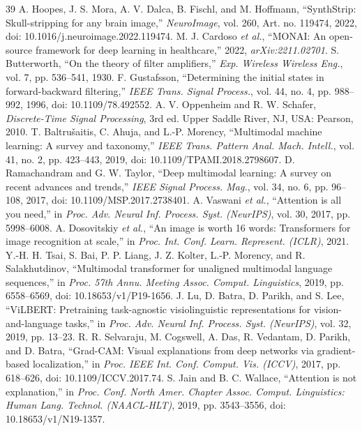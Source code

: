 \begin{thebibliography}{39}
A. Hoopes, J. S. Mora, A. V. Dalca, B. Fischl, and M. Hoffmann, ``SynthStrip: Skull-stripping for any brain image,'' \emph{NeuroImage}, vol. 260, Art. no. 119474, 2022, doi: 10.1016/j.neuroimage.2022.119474.
M. J. Cardoso \emph{et al.}, ``MONAI: An open-source framework for deep learning in healthcare,'' 2022, \emph{arXiv:2211.02701}.
S. Butterworth, ``On the theory of filter amplifiers,'' \emph{Exp. Wireless Wireless Eng.}, vol. 7, pp. 536--541, 1930.
F. Gustafsson, ``Determining the initial states in forward-backward filtering,'' \emph{IEEE Trans. Signal Process.}, vol. 44, no. 4, pp. 988--992, 1996, doi: 10.1109/78.492552.
A. V. Oppenheim and R. W. Schafer, \emph{Discrete-Time Signal Processing}, 3rd ed. Upper Saddle River, NJ, USA: Pearson, 2010.
T. Baltru\v{s}aitis, C. Ahuja, and L.-P. Morency, ``Multimodal machine learning: A survey and taxonomy,'' \emph{IEEE Trans. Pattern Anal. Mach. Intell.}, vol. 41, no. 2, pp. 423--443, 2019, doi: 10.1109/TPAMI.2018.2798607.
D. Ramachandram and G. W. Taylor, ``Deep multimodal learning: A survey on recent advances and trends,'' \emph{IEEE Signal Process. Mag.}, vol. 34, no. 6, pp. 96--108, 2017, doi: 10.1109/MSP.2017.2738401.
A. Vaswani \emph{et al.}, ``Attention is all you need,'' in \emph{Proc. Adv. Neural Inf. Process. Syst. (NeurIPS)}, vol. 30, 2017, pp. 5998--6008.
A. Dosovitskiy \emph{et al.}, ``An image is worth 16 words: Transformers for image recognition at scale,'' in \emph{Proc. Int. Conf. Learn. Represent. (ICLR)}, 2021.
Y.-H. H. Tsai, S. Bai, P. P. Liang, J. Z. Kolter, L.-P. Morency, and R. Salakhutdinov, ``Multimodal transformer for unaligned multimodal language sequences,'' in \emph{Proc. 57th Annu. Meeting Assoc. Comput. Linguistics}, 2019, pp. 6558--6569, doi: 10.18653/v1/P19-1656.
J. Lu, D. Batra, D. Parikh, and S. Lee, ``ViLBERT: Pretraining task-agnostic visiolinguistic representations for vision-and-language tasks,'' in \emph{Proc. Adv. Neural Inf. Process. Syst. (NeurIPS)}, vol. 32, 2019, pp. 13--23.
R. R. Selvaraju, M. Cogswell, A. Das, R. Vedantam, D. Parikh, and D. Batra, ``Grad-CAM: Visual explanations from deep networks via gradient-based localization,'' in \emph{Proc. IEEE Int. Conf. Comput. Vis. (ICCV)}, 2017, pp. 618--626, doi: 10.1109/ICCV.2017.74.
S. Jain and B. C. Wallace, ``Attention is not explanation,'' in \emph{Proc. Conf. North Amer. Chapter Assoc. Comput. Linguistics: Human Lang. Technol. (NAACL-HLT)}, 2019, pp. 3543--3556, doi: 10.18653/v1/N19-1357.

\end{thebibliography}
